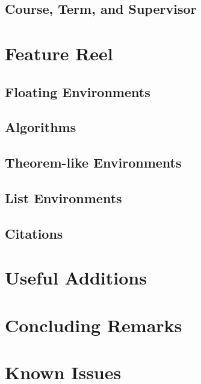 \documentclass[logo]{mlai-report}
\begin{document}
	\subsection{Course, Term, and Supervisor} 
	
	\section{Feature Reel} 
	
	\subsection{Floating Environments} 
	
	\subsection{Algorithms}
	
	\subsection{Theorem-like Environments} 
	
	\subsection{List Environments} 
	
	\subsection{Citations} 
	
	\section{Useful Additions} 
	
	\section{Concluding Remarks}
	
	\printbibliography
	
	\appendix
	
	\section{Known Issues} 
\end{document}
